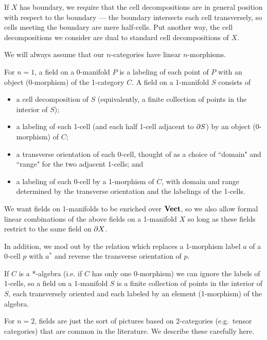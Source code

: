 If $X$ has boundary, we require that the cell decompositions are in general
position with respect to the boundary --- the boundary intersects each cell
transversely, so cells meeting the boundary are mere half-cells.
Put another way, the cell decompositions we consider are dual to standard cell
decompositions of $X$.

We will always assume that our $n$-categories have linear $n$-morphisms.

For $n=1$, a field on a 0-manifold $P$ is a labeling of each point of $P$ with
an object (0-morphism) of the 1-category $C$.
A field on a 1-manifold $S$ consists of
\begin{itemize}
    \item a cell decomposition of $S$ (equivalently, a finite collection
of points in the interior of $S$);
    \item a labeling of each 1-cell (and each half 1-cell adjacent to $\partial S$)
by an object (0-morphism) of $C$;
    \item a transverse orientation of each 0-cell, thought of as a choice of
``domain" and ``range" for the two adjacent 1-cells; and
    \item a labeling of each 0-cell by a 1-morphism of $C$, with
domain and range determined by the transverse orientation and the labelings of the 1-cells.
\end{itemize}

We want fields on 1-manifolds to be enriched over $\text{\textbf{Vect}}$, so we also allow formal linear combinations
of the above fields on a 1-manifold $X$ so long as these fields restrict to the same field on $\partial X$.

In addition, we mod out by the relation which replaces
a 1-morphism label $a$ of a 0-cell $p$ with $a^*$ and reverse the transverse orientation of $p$.

If $C$ is a *-algebra (i.e. if $C$ has only one 0-morphism) we can ignore the labels
of 1-cells, so a field on a 1-manifold $S$ is a finite collection of points in the
interior of $S$, each transversely oriented and each labeled by an element (1-morphism)
of the algebra.

\medskip

For $n=2$, fields are just the sort of pictures based on 2-categories (e.g.\ tensor categories)
that are common in the literature.
We describe these carefully here.

